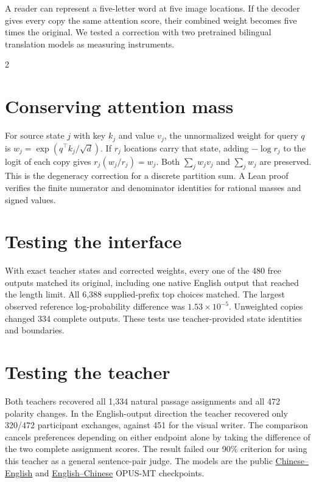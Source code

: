 \newpage
{}
\noindent A reader can represent a five-letter word at five image locations. If the decoder gives every copy the same attention score, their combined weight becomes five times the original. We tested a correction with two pretrained bilingual translation models as measuring instruments.
\begin{multicols}{2}
\section*{Conserving attention mass}
For source state $j$ with key $k_j$ and value $v_j$, the unnormalized weight for query $q$ is $w_j=\exp(q^\top k_j/\sqrt{d})$. If $r_j$ locations carry that state, adding $-\log r_j$ to the logit of each copy gives $r_j(w_j/r_j)=w_j$. Both $\sum_j w_jv_j$ and $\sum_j w_j$ are preserved. This is the degeneracy correction for a discrete partition sum. A Lean proof verifies the finite numerator and denominator identities for rational masses and signed values.
\section*{Testing the interface}
With exact teacher states and corrected weights, every one of the 480 free outputs matched its original, including one native English output that reached the length limit. All 6,388 supplied-prefix top choices matched. The largest observed reference log-probability difference was $1.53\times10^{-5}$. Unweighted copies changed 334 complete outputs. These tests use teacher-provided state identities and boundaries.
\section*{Testing the teacher}
Both teachers recovered all 1,334 natural passage assignments and all 472 polarity changes. In the English-output direction the teacher recovered only 320/472 participant exchanges, against 451 for the visual writer. The comparison cancels preferences depending on either endpoint alone by taking the difference of the two complete assignment scores. The result failed our 90\% criterion for using this teacher as a general sentence-pair judge. The models are the public \href{https://huggingface.co/Helsinki-NLP/opus-mt-zh-en}{Chinese--English} and \href{https://huggingface.co/Helsinki-NLP/opus-mt-en-zh}{English--Chinese} OPUS-MT checkpoints.
\end{multicols}
